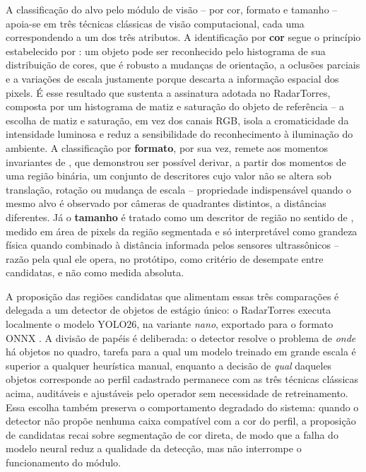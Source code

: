 \documentclass[12pt,a4paper]{article}
\begin{document}
A classificação do alvo pelo módulo de visão -- por cor, formato e tamanho -- apoia-se em três
técnicas clássicas de visão computacional, cada uma correspondendo a um dos três atributos. A
identificação por \textbf{cor} segue o princípio estabelecido por
: um objeto pode ser reconhecido pelo histograma de sua
distribuição de cores, que é robusto a mudanças de orientação, a oclusões parciais e a variações
de escala justamente porque descarta a informação espacial dos pixels. É esse resultado que
sustenta a assinatura adotada no RadarTorres, composta por um histograma de matiz e saturação do
objeto de referência -- a escolha de matiz e saturação, em vez dos canais RGB, isola a
cromaticidade da intensidade luminosa e reduz a sensibilidade do reconhecimento à iluminação do
ambiente. A classificação por \textbf{formato}, por sua vez, remete aos momentos invariantes de
, que demonstrou ser possível derivar, a partir dos momentos de uma
região binária, um conjunto de descritores cujo valor não se altera sob translação, rotação ou
mudança de escala -- propriedade indispensável quando o mesmo alvo é observado por câmeras de
quadrantes distintos, a distâncias diferentes. Já o \textbf{tamanho} é tratado como um descritor de
região no sentido de , medido em área de pixels da região segmentada e
só interpretável como grandeza física quando combinado à distância informada pelos sensores
ultrassônicos -- razão pela qual ele opera, no protótipo, como critério de desempate entre
candidatas, e não como medida absoluta.

A proposição das regiões candidatas que alimentam essas três comparações é delegada a um detector
de objetos de estágio único: o RadarTorres executa localmente o modelo YOLO26, na variante
\textit{nano}, exportado para o formato ONNX \cite{ultralytics_yolo26}. A divisão de papéis é
deliberada: o detector resolve o problema de \textit{onde} há objetos no quadro, tarefa para a qual
um modelo treinado em grande escala é superior a qualquer heurística manual, enquanto a decisão de
\textit{qual} daqueles objetos corresponde ao perfil cadastrado permanece com as três técnicas
clássicas acima, auditáveis e ajustáveis pelo operador sem necessidade de retreinamento. Essa
escolha também preserva o comportamento degradado do sistema: quando o detector não propõe nenhuma
caixa compatível com a cor do perfil, a proposição de candidatas recai sobre segmentação de cor
direta, de modo que a falha do modelo neural reduz a qualidade da detecção, mas não interrompe o
funcionamento do módulo.
\end{document}
